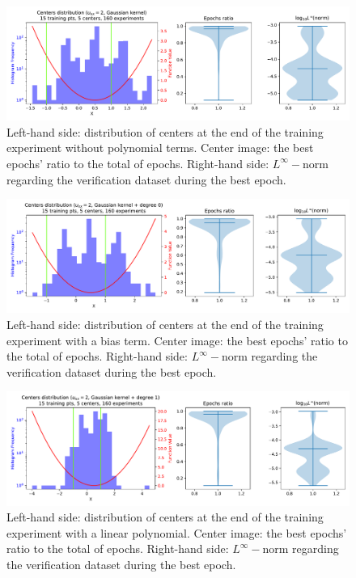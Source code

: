 \documentclass[12pt]{report} %
\begin{document}
\begin{figure}[ht]
  \includegraphics[width=\textwidth]{imagenes/experiments/1d/ode/tr15_c5_gaussian_kernel_deg-1.pdf}
  \caption{Left-hand side: distribution of centers at the end of the training experiment
    without polynomial terms. Center
    image: the best epochs' ratio to the total of epochs. Right-hand side: $L^\infty-$norm
    regarding the verification dataset during the best epoch.}
  \label{fig:tr15-c5-gaussian-kernel-ode-1d}
\end{figure}

\begin{figure}[ht]
  \includegraphics[width=\textwidth]{imagenes/experiments/1d/ode/tr15_c5_gaussian_kernel_deg0.pdf}
  \caption{Left-hand side: distribution of centers at the end of the training experiment
    with a bias term. Center
    image: the best epochs' ratio to the total of epochs. Right-hand side: $L^\infty-$norm regarding
    the verification dataset during the best epoch.}
  \label{fig:tr15-c5-gaussian-kernel-bias-ode-1d}
\end{figure}

\begin{figure}[ht]
  \includegraphics[width=\textwidth]{imagenes/experiments/1d/ode/tr15_c5_gaussian_kernel_deg1.pdf}
  \caption{Left-hand side: distribution of centers at the end of the training experiment
    with a linear polynomial. Center
    image: the best epochs' ratio to the total of epochs. Right-hand side: $L^\infty-$norm regarding
    the verification dataset during the best epoch.}
  \label{fig:tr15-c5-gaussian-kernel-linear-ode-1d}
\end{figure}
\end{document}
